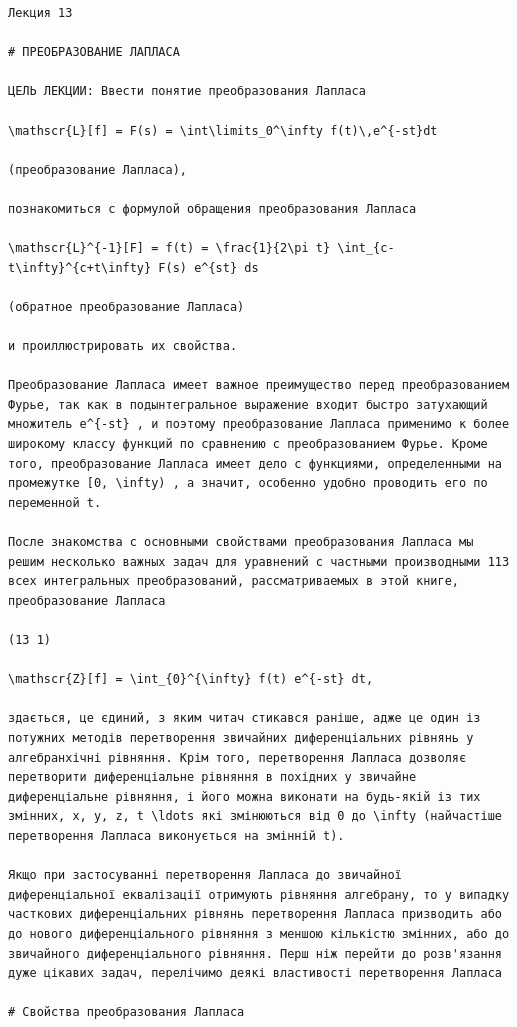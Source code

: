 \documentclass[
  ukrainian,
]{article}
\begin{document}
\begin{verbatim}
Лекция 13

# ПРЕОБРАЗОВАНИЕ ЛАПЛАСА

ЦЕЛЬ ЛЕКЦИИ: Ввести понятие преобразования Лапласа

\mathscr{L}[f] = F(s) = \int\limits_0^\infty f(t)\,e^{-st}dt

(преобразование Лапласа),

познакомиться с формулой обращения преобразования Лапласа

\mathscr{L}^{-1}[F] = f(t) = \frac{1}{2\pi t} \int_{c-t\infty}^{c+t\infty} F(s) e^{st} ds

(обратное преобразование Лапласа)

и проиллюстрировать их свойства.

Преобразование Лапласа имеет важное преимущество перед преобразованием Фурье, так как в подынтегральное выражение входит быстро затухающий множитель e^{-st} , и поэтому преобразование Лапласа применимо к более широкому классу функций по сравнению с преобразованием Фурье. Кроме того, преобразование Лапласа имеет дело с функциями, определенными на промежутке [0, \infty) , а значит, особенно удобно проводить его по переменной t.

После знакомства с основными свойствами преобразования Лапласа мы решим несколько важных задач для уравнений с частными производными 113 всех интегральных преобразований, рассматриваемых в этой книге, преобразование Лапласа

(13 1)

\mathscr{Z}[f] = \int_{0}^{\infty} f(t) e^{-st} dt,

здається, це єдиний, з яким читач стикався раніше, адже це один із потужних методів перетворення звичайних диференціальних рівнянь у алгебранхічні рівняння. Крім того, перетворення Лапласа дозволяє перетворити диференціальне рівняння в похідних у звичайне диференціальне рівняння, і його можна виконати на будь-якій із тих змінних, x, y, z, t \ldots які змінюються від 0 до \infty (найчастіше перетворення Лапласа виконується на змінній t).

Якщо при застосуванні перетворення Лапласа до звичайної диференціальної еквалізації отримують рівняння алгебрану, то у випадку часткових диференціальних рівнянь перетворення Лапласа призводить або до нового диференціального рівняння з меншою кількістю змінних, або до звичайного диференціального рівняння. Перш ніж перейти до розв'язання дуже цікавих задач, перелічимо деякі властивості перетворення Лапласа

# Свойства преобразования Лапласа


\end{verbatim}
\end{document}

